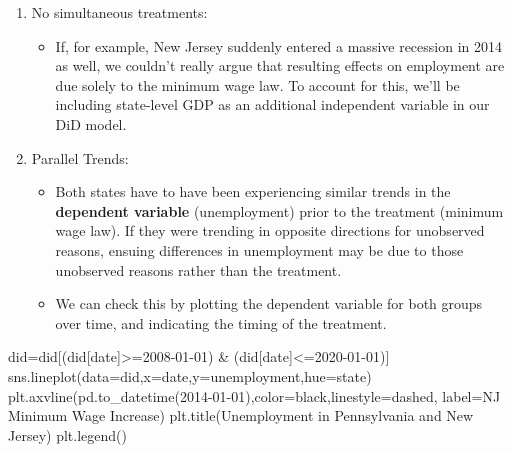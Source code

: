 \documentclass[
  letterpaper,
  DIV=11,
  numbers=noendperiod]{scrreprt}
\newenvironment{Shaded}{\begin{snugshade}}{\end{snugshade}}
\newcommand{\NormalTok}[1]{\textcolor[rgb]{0.00,0.23,0.31}{#1}}
\newcommand{\OperatorTok}[1]{\textcolor[rgb]{0.37,0.37,0.37}{#1}}
\newcommand{\StringTok}[1]{\textcolor[rgb]{0.13,0.47,0.30}{#1}}
\providecommand{\tightlist}{%
  \setlength{\itemsep}{0pt}\setlength{\parskip}{0pt}}\usepackage{longtable,booktabs,array}
\begin{document}
\begin{enumerate}
\def\labelenumi{\arabic{enumi}.}
\tightlist
\item
  No simultaneous treatments:

  \begin{itemize}
  \tightlist
  \item
    If, for example, New Jersey suddenly entered a massive recession in
    2014 as well, we couldn't really argue that resulting effects on
    employment are due solely to the minimum wage law. To account for
    this, we'll be including state-level GDP as an additional
    independent variable in our DiD model.
  \end{itemize}
\item
  Parallel Trends:

  \begin{itemize}
  \tightlist
  \item
    Both states have to have been experiencing similar trends in the
    \textbf{dependent variable} (unemployment) prior to the treatment
    (minimum wage law). If they were trending in opposite directions for
    unobserved reasons, ensuing differences in unemployment may be due
    to those unobserved reasons rather than the treatment.
  \item
    We can check this by plotting the dependent variable for both groups
    over time, and indicating the timing of the treatment.
  \end{itemize}
\end{enumerate}

\begin{Shaded}
\begin{Highlighting}[]
\NormalTok{did}\OperatorTok{=}\NormalTok{did[(did[}\StringTok{\textquotesingle{}date\textquotesingle{}}\NormalTok{]}\OperatorTok{\textgreater{}=}\StringTok{\textquotesingle{}2008{-}01{-}01\textquotesingle{}}\NormalTok{) }\OperatorTok{\&}\NormalTok{ (did[}\StringTok{\textquotesingle{}date\textquotesingle{}}\NormalTok{]}\OperatorTok{\textless{}=}\StringTok{\textquotesingle{}2020{-}01{-}01\textquotesingle{}}\NormalTok{)]}
\NormalTok{sns.lineplot(data}\OperatorTok{=}\NormalTok{did,x}\OperatorTok{=}\StringTok{\textquotesingle{}date\textquotesingle{}}\NormalTok{,y}\OperatorTok{=}\StringTok{\textquotesingle{}unemployment\textquotesingle{}}\NormalTok{,hue}\OperatorTok{=}\StringTok{\textquotesingle{}state\textquotesingle{}}\NormalTok{)}
\NormalTok{plt.axvline(pd.to\_datetime(}\StringTok{\textquotesingle{}2014{-}01{-}01\textquotesingle{}}\NormalTok{),color}\OperatorTok{=}\StringTok{\textquotesingle{}black\textquotesingle{}}\NormalTok{,linestyle}\OperatorTok{=}\StringTok{\textquotesingle{}dashed\textquotesingle{}}\NormalTok{, label}\OperatorTok{=}\StringTok{\textquotesingle{}NJ Minimum Wage Increase\textquotesingle{}}\NormalTok{)}
\NormalTok{plt.title(}\StringTok{\textquotesingle{}Unemployment in Pennsylvania and New Jersey\textquotesingle{}}\NormalTok{)}
\NormalTok{plt.legend()}
\end{Highlighting}
\end{Shaded}
\end{document}
